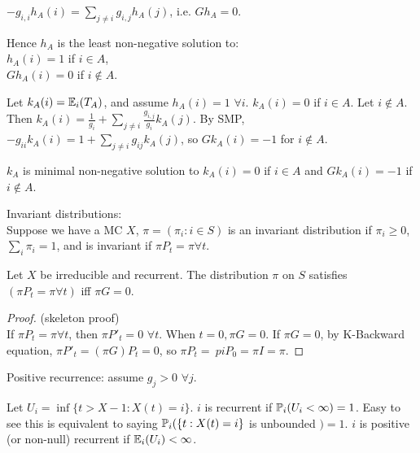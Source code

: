 \documentclass[a4paper]{article}
\begin{document}
$-g_{i,i}h_A(i) = \sum_{j \neq i} g_{i,j} h_A(j)$, i.e. $Gh_A = 0$.

Hence $h_A$ is the least non-negative solution to:\\
$h_A(i) = 1$ if $i \in A$,\\
$Gh_A(i) = 0$ if $i \not\in A$.

Let $k_A(i) = \E_i(T_A)$, and assume $h_A(i) = 1$ $\forall i$. $k_A(i) = 0$ if $i \in A$. Let $i \not\in A$. Then $k_A(i) = \frac{1}{g_i} + \sum_{j \neq i} \frac{g_{i,j}}{g_i} k_A(j)$. By SMP, $-g_{ii}k_A(i) = 1+\sum_{j \neq i} g_{ij} k_A(j)$, so $Gk_A(i) = -1$ for $i \not\in A$.

\begin{thm}
$k_A$ is minimal non-negative solution to $k_A(i) = 0$ if $i\in A$ and $Gk_A(i) = -1$ if $i \not\in A$.
\end{thm}

Invariant distributions:\\
Suppose we have a MC $X$, $\pi=(\pi_i:i \in S)$ is an invariant distribution if $\pi_i \geq 0$, $\sum_i \pi_i = 1$, and is invariant if $\pi P_t = \pi \forall t$.

\begin{thm}
Let $X$ be irreducible and recurrent. The distribution $\pi$ on $S$ satisfies $(\pi P_t = \pi \forall t)$ iff $\pi G=0$.
\begin{proof} (skeleton proof)\\
If $\pi P_t = \pi \forall t$, then $\pi P'_t = 0$ $\forall t$. When $t=0,\pi G = 0$. If $\pi G = 0$, by K-Backward equation, $\pi P'_t = (\pi G) P_t = 0$, so $\pi P_t =\ pi P_0 = \pi I = \pi$.
\end{proof}
\end{thm}

Positive recurrence: assume $g_j>0$ $\forall j$.

Let $U_i = \inf \{t>X-1:X(t) = i\}$. $i$ is recurrent if $\P_i (U_i < \infty) =1$. Easy to see this is equivalent to saying $\P_i(\{t:X(t) = i\}$ is unbounded $) = 1$. $i$ is positive (or non-null) recurrent if $\E_i(U_i) < \infty$.
\end{document}

